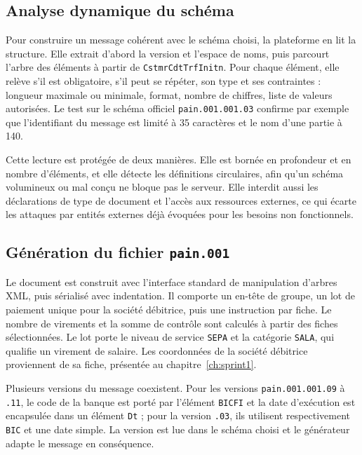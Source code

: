 \subsection{Analyse dynamique du schéma}

Pour construire un message cohérent avec le schéma choisi, la plateforme en lit la structure. Elle extrait d'abord la version et l'espace de noms, puis parcourt l'arbre des éléments à partir de \texttt{CstmrCdtTrfInitn}. Pour chaque élément, elle relève s'il est obligatoire, s'il peut se répéter, son type et ses contraintes : longueur maximale ou minimale, format, nombre de chiffres, liste de valeurs autorisées. Le test sur le schéma officiel \texttt{pain.001.001.03} confirme par exemple que l'identifiant du message est limité à 35 caractères et le nom d'une partie à 140.

Cette lecture est protégée de deux manières. Elle est bornée en profondeur et en nombre d'éléments, et elle détecte les définitions circulaires, afin qu'un schéma volumineux ou mal conçu ne bloque pas le serveur. Elle interdit aussi les déclarations de type de document et l'accès aux ressources externes, ce qui écarte les attaques par entités externes déjà évoquées pour les besoins non fonctionnels.

\subsection{Génération du fichier \texttt{pain.001}}

Le document est construit avec l'interface standard de manipulation d'arbres XML, puis sérialisé avec indentation. Il comporte un en-tête de groupe, un lot de paiement unique pour la société débitrice, puis une instruction par fiche. Le nombre de virements et la somme de contrôle sont calculés à partir des fiches sélectionnées. Le lot porte le niveau de service \texttt{SEPA} et la catégorie \texttt{SALA}, qui qualifie un virement de salaire. Les coordonnées de la société débitrice proviennent de sa fiche, présentée au chapitre~\ref{ch:sprint1}.

Plusieurs versions du message coexistent. Pour les versions \texttt{pain.001.001.09} à \texttt{.11}, le code de la banque est porté par l'élément \texttt{BICFI} et la date d'exécution est encapsulée dans un élément \texttt{Dt} ; pour la version \texttt{.03}, ils utilisent respectivement \texttt{BIC} et une date simple. La version est lue dans le schéma choisi et le générateur adapte le message en conséquence.

